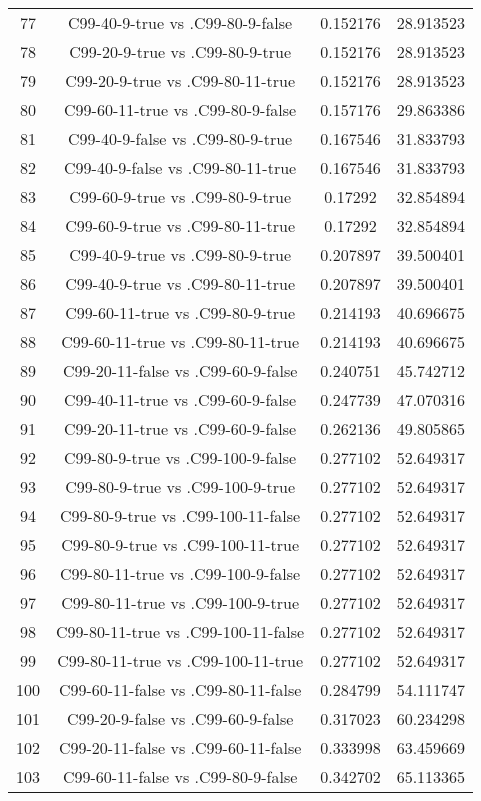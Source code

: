 \documentclass[a4paper,10pt]{article}
\begin{document}
\begin{landscape}
\begin{table}[!htp]
\begin{tabular}{cccc}
77&C99-40-9-true vs .C99-80-9-false&0.152176&28.913523\\
78&C99-20-9-true vs .C99-80-9-true&0.152176&28.913523\\
79&C99-20-9-true vs .C99-80-11-true&0.152176&28.913523\\
80&C99-60-11-true vs .C99-80-9-false&0.157176&29.863386\\
81&C99-40-9-false vs .C99-80-9-true&0.167546&31.833793\\
82&C99-40-9-false vs .C99-80-11-true&0.167546&31.833793\\
83&C99-60-9-true vs .C99-80-9-true&0.17292&32.854894\\
84&C99-60-9-true vs .C99-80-11-true&0.17292&32.854894\\
85&C99-40-9-true vs .C99-80-9-true&0.207897&39.500401\\
86&C99-40-9-true vs .C99-80-11-true&0.207897&39.500401\\
87&C99-60-11-true vs .C99-80-9-true&0.214193&40.696675\\
88&C99-60-11-true vs .C99-80-11-true&0.214193&40.696675\\
89&C99-20-11-false vs .C99-60-9-false&0.240751&45.742712\\
90&C99-40-11-true vs .C99-60-9-false&0.247739&47.070316\\
91&C99-20-11-true vs .C99-60-9-false&0.262136&49.805865\\
92&C99-80-9-true vs .C99-100-9-false&0.277102&52.649317\\
93&C99-80-9-true vs .C99-100-9-true&0.277102&52.649317\\
94&C99-80-9-true vs .C99-100-11-false&0.277102&52.649317\\
95&C99-80-9-true vs .C99-100-11-true&0.277102&52.649317\\
96&C99-80-11-true vs .C99-100-9-false&0.277102&52.649317\\
97&C99-80-11-true vs .C99-100-9-true&0.277102&52.649317\\
98&C99-80-11-true vs .C99-100-11-false&0.277102&52.649317\\
99&C99-80-11-true vs .C99-100-11-true&0.277102&52.649317\\
100&C99-60-11-false vs .C99-80-11-false&0.284799&54.111747\\
101&C99-20-9-false vs .C99-60-9-false&0.317023&60.234298\\
102&C99-20-11-false vs .C99-60-11-false&0.333998&63.459669\\
103&C99-60-11-false vs .C99-80-9-false&0.342702&65.113365\\

\end{tabular}
\end{table}
\end{landscape}
\end{document}
